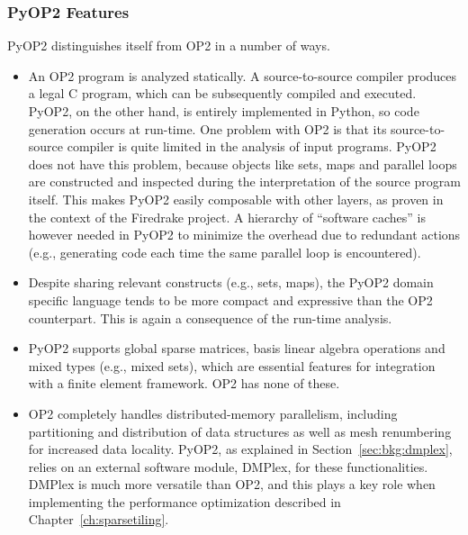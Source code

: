 

\subsubsection{PyOP2 Features}
PyOP2 distinguishes itself from OP2 in a number of ways.

\begin{itemize}
\item An OP2 program is analyzed statically. A source-to-source compiler produces a legal C program, which can be subsequently compiled and executed. PyOP2, on the other hand, is entirely implemented in Python, so code generation occurs at run-time. One problem with OP2 is that its source-to-source compiler is quite limited in the analysis of input programs. PyOP2 does not have this problem, because objects like sets, maps and parallel loops are constructed and inspected during the interpretation of the source program itself. This makes PyOP2 easily composable with other layers, as proven in the context of the Firedrake project. A hierarchy of ``software caches'' is however needed in PyOP2 to minimize the overhead due to redundant actions (e.g., generating code each time the same parallel loop is encountered).

\item Despite sharing relevant constructs (e.g., sets, maps), the PyOP2 domain specific language tends to be more compact and expressive than the OP2 counterpart. This is again a consequence of the run-time analysis.

\item PyOP2 supports global sparse matrices, basis linear algebra operations and mixed types (e.g., mixed sets), which are essential features for integration with a finite element framework. OP2 has none of these. 

\item OP2 completely handles distributed-memory parallelism, including partitioning and distribution of data structures as well as mesh renumbering for increased data locality. PyOP2, as explained in Section~\ref{sec:bkg:dmplex}, relies on an external software module, DMPlex, for these functionalities. DMPlex is much more versatile than OP2, and this plays a key role when implementing the performance optimization described in Chapter~\ref{ch:sparsetiling}.
\end{itemize}



